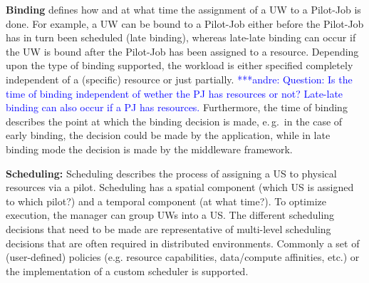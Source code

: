\documentclass[conference,final]{IEEEtran}
\newcommand{\jhanote}[1]{ {\textcolor{red} { ***shantenu: #1 }}}
\newcommand{\alnote}[1]{ {\textcolor{blue} { ***andre: #1 }}}
\newcommand{\alnote}[1]{}
\newcommand{\jhanote}[1]{}
\begin{document}
\textbf{Binding} defines how and at what time the assignment of a
UW to a Pilot-Job is done.  For example, a UW can be bound to a
Pilot-Job either before the Pilot-Job has in turn been scheduled (late
binding), whereas late-late binding can occur if the UW is bound after
the Pilot-Job has been assigned to a resource.  Depending upon the
type of binding supported, the workload is either specified completely
independent of a (specific) resource or just partially.
\alnote{Question: Is the time of binding independent of wether the PJ
  has resources or not? Late-late binding can also occur if a PJ has
  resources.}  Furthermore, the time of binding describes the point at
which the binding decision is made, e.\,g.\ in the case of early
binding, the decision could be made by the application, while in late
binding mode the decision is made by the middleware
framework. 



\textbf{Scheduling:} Scheduling describes the process of assigning a US to
physical resources via a pilot. Scheduling has a spatial component (which US is
assigned to which pilot?) and a temporal component (at what time?). To optimize
execution, the manager can group UWs into a US. The different scheduling
decisions that need to be made are representative of multi-level scheduling
decisions that are often required in distributed environments. Commonly a set of
(user-defined) policies (e.g. resource capabilities, data/compute affinities,
etc.) or the implementation of a custom scheduler is supported.
\end{document}
